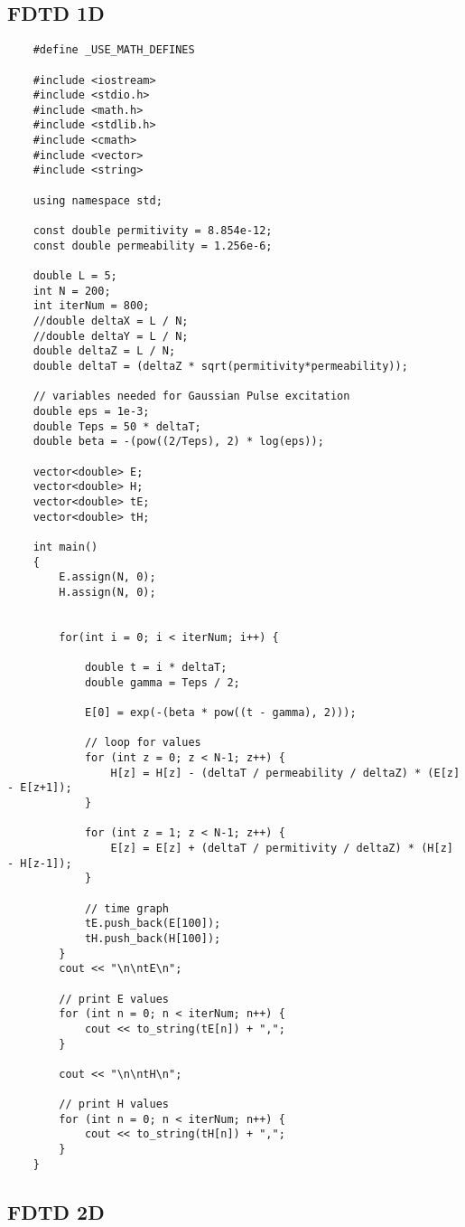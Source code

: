 \subsection{FDTD 1D}
\begin{verbatim}
	#define _USE_MATH_DEFINES
	
	#include <iostream>
	#include <stdio.h>
	#include <math.h>
	#include <stdlib.h>
	#include <cmath>
	#include <vector>
	#include <string>
	
	using namespace std;
	
	const double permitivity = 8.854e-12;
	const double permeability = 1.256e-6;
	
	double L = 5;
	int N = 200;
	int iterNum = 800;
	//double deltaX = L / N;
	//double deltaY = L / N;
	double deltaZ = L / N;
	double deltaT = (deltaZ * sqrt(permitivity*permeability));
	
	// variables needed for Gaussian Pulse excitation
	double eps = 1e-3;
	double Teps = 50 * deltaT;
	double beta = -(pow((2/Teps), 2) * log(eps));
	
	vector<double> E;
	vector<double> H;
	vector<double> tE;
	vector<double> tH;
	
	int main()
	{
		E.assign(N, 0);
		H.assign(N, 0);
		
		
		for(int i = 0; i < iterNum; i++) {
			
			double t = i * deltaT;
			double gamma = Teps / 2;
			
			E[0] = exp(-(beta * pow((t - gamma), 2)));
			
			// loop for values
			for (int z = 0; z < N-1; z++) {
				H[z] = H[z] - (deltaT / permeability / deltaZ) * (E[z] - E[z+1]);
			}
			
			for (int z = 1; z < N-1; z++) {
				E[z] = E[z] + (deltaT / permitivity / deltaZ) * (H[z] - H[z-1]);
			}
			
			// time graph
			tE.push_back(E[100]);
			tH.push_back(H[100]);
		}
		cout << "\n\ntE\n";
		
		// print E values
		for (int n = 0; n < iterNum; n++) {
			cout << to_string(tE[n]) + ",";
		}
		
		cout << "\n\ntH\n";
		
		// print H values
		for (int n = 0; n < iterNum; n++) {
			cout << to_string(tH[n]) + ",";
		}
	}	
\end{verbatim}

\subsection{FDTD 2D}


